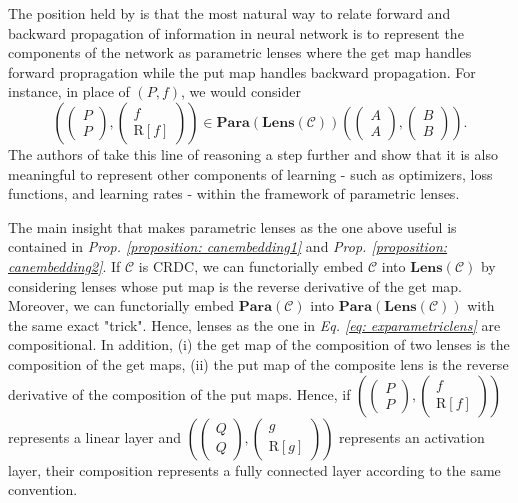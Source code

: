 \documentclass[11pt,a4paper,openright,twoside]{report}
\theoremstyle{plain}
\theoremstyle{definition}
\begin{document}
The position held by \cite{cruttwellDeepLearningParametric} is that the most natural way to relate forward and backward propagation of information in neural network is to represent the components of the network as parametric lenses where the get map handles forward propragation while the put map handles backward propagation. For instance,  in place of $(P,f)$, we would consider
\begin{equation}
  \label{eq: exparametriclens}
  \left(\begin{pmatrix} P \\ P \end{pmatrix},\begin{pmatrix} f \\ \mathrm{R}[f] \end{pmatrix}\right) 
  \in \mathbf{Para}(\mathbf{Lens}(\mathcal{C}))
  \left(\begin{pmatrix} A \\ A \end{pmatrix},\begin{pmatrix} B \\ B \end{pmatrix}\right).
\end{equation}
The authors of \cite{cruttwellDeepLearningParametric} take this line of reasoning a step further and show that it is also meaningful to represent other components of learning - such as optimizers, loss functions, and learning rates - within the framework of parametric lenses. 


The main insight that makes parametric lenses as the one above useful is contained in \textit{Prop. \ref{proposition: canembedding1}} and \textit{Prop. \ref{proposition: canembedding2}}. If $\mathcal{C}$ is CRDC, we can functorially embed $\mathcal{C}$ into $\mathbf{Lens}(\mathcal{C})$ by considering lenses whose put map is the reverse derivative of the get map. Moreover, we can functorially embed $\mathbf{Para}(\mathcal{C})$ into $\mathbf{Para}(\mathbf{Lens}(\mathcal{C}))$ with the same exact "trick". Hence, lenses as the one in \textit{Eq. \ref{eq: exparametriclens}} are compositional. In addition, (i) the get map of the composition of two lenses is the composition of the get maps, (ii) the put map of the composite lens is the reverse derivative of the composition of the put maps. Hence, if $\left(\left(\begin{smallmatrix} P \\ P \end{smallmatrix}\right),\left(\begin{smallmatrix} f \\ \mathrm{R}[f] \end{smallmatrix}\right)\right)$ represents a linear layer and $\left(\left(\begin{smallmatrix} Q \\ Q \end{smallmatrix}\right),\left(\begin{smallmatrix} g \\ \mathrm{R}[g] \end{smallmatrix}\right)\right)$ represents an activation layer, their composition represents a fully connected layer according to the same convention.
\end{document}
